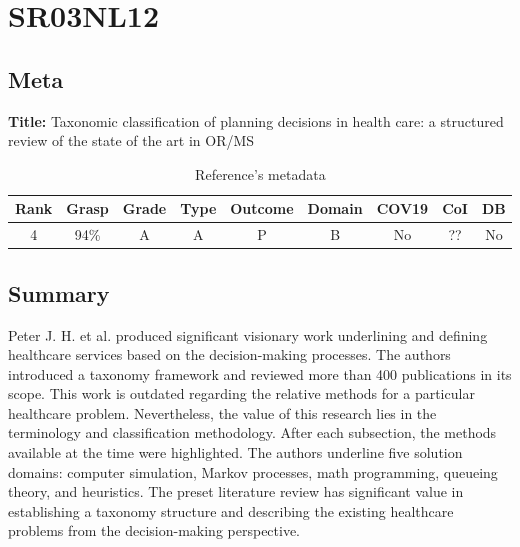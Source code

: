 \section{ SR03NL12 }


\subsection{Meta}

    \textbf{Title:}
    Taxonomic classification of planning decisions in health care: a structured review of the state of the art in OR/MS

    \begin{table}[H]
        \centering
        \begin{tabular}{|c|c|c|c|c|c|c|c|c|}
            \hline
                \textbf{Rank} & \textbf{Grasp} & \textbf{Grade} & \textbf{Type} & \textbf{Outcome} & \textbf{Domain} & \textbf{COV19} & \textbf{CoI} & \textbf{DB} \\
            \hline
                4 & 94\% & A & A & P & B & No & ?? & No \\
            \hline
        \end{tabular}
        \caption{Reference's metadata}
        \label{tab:SR03NL12}
    \end{table}

\subsection{Summary}
    Peter J. H. et al. produced significant visionary work underlining and defining healthcare services based on the decision-making processes. The authors introduced a taxonomy framework and reviewed more than 400 publications in its scope. This work is outdated regarding the relative methods for a particular healthcare problem. Nevertheless, the value of this research lies in the terminology and classification methodology. After each subsection, the methods available at the time were highlighted. The authors underline five solution domains: computer simulation, Markov processes, math programming, queueing theory, and heuristics. The preset literature review has significant value in establishing a taxonomy structure and describing the existing healthcare problems from the decision-making perspective.
    


